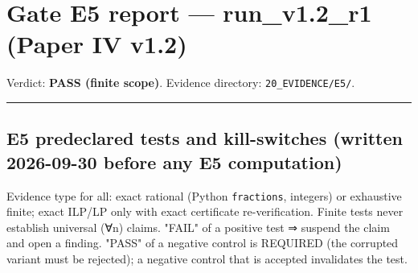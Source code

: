 \documentclass[
]{article}
\author{}
\date{}
\begin{document}
\section{Gate E5 report --- run\_v1.2\_r1 (Paper IV
v1.2)}\label{gate-e5-report--run_v12_r1-paper-iv-v12}

Verdict: \textbf{PASS (finite scope)}. Evidence directory:
\texttt{20\_EVIDENCE/E5/}.

\begin{center}\rule{0.5\linewidth}{0.5pt}\end{center}

\subsection{E5 predeclared tests and kill-switches (written 2026-09-30
before any E5
computation)}\label{e5-predeclared-tests-and-kill-switches-written-2026-09-30-before-any-e5-computation}

Evidence type for all: exact rational (Python \texttt{fractions},
integers) or exhaustive finite; exact ILP/LP only with exact certificate
re-verification. Finite tests never establish universal (∀n) claims.
"FAIL" of a positive test ⇒ suspend the claim and open a finding. "PASS"
of a negative control is REQUIRED (the corrupted variant must be
rejected); a negative control that is accepted invalidates the test.
\end{document}
